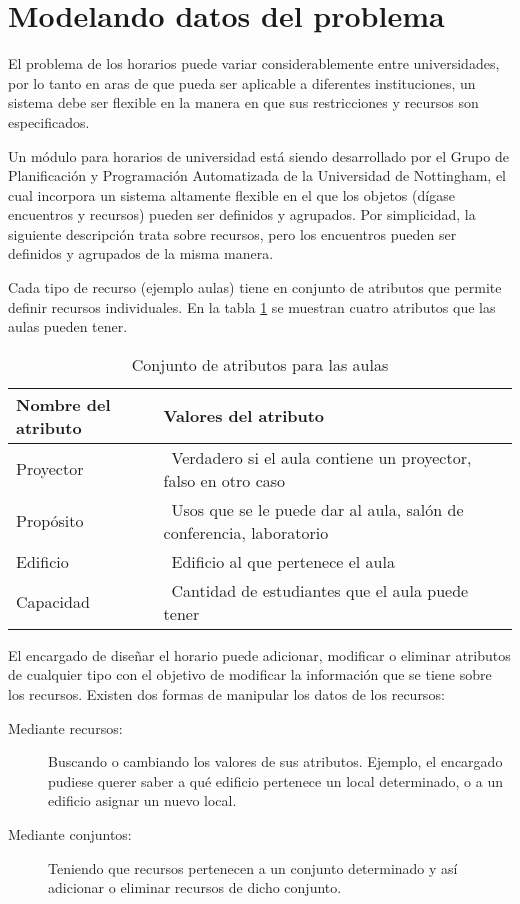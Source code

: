 \section{Modelando datos del problema}

El problema de los horarios puede variar considerablemente entre universidades, por lo tanto en aras de que pueda ser aplicable a diferentes instituciones, un sistema debe ser flexible en la manera en que sus restricciones y recursos son especificados.

Un módulo para horarios de universidad está siendo desarrollado por el Grupo de Planificación y Programación Automatizada de la Universidad de Nottingham, el cual incorpora un sistema altamente flexible en el que los objetos (dígase encuentros y recursos) pueden ser definidos y agrupados. Por simplicidad, la siguiente descripción trata sobre recursos, pero los encuentros pueden ser definidos y agrupados de la misma manera.

Cada tipo de recurso (ejemplo aulas) tiene en conjunto de atributos que permite definir recursos individuales. En la tabla \ref{table:atributes} se muestran cuatro atributos que las aulas pueden tener.

\begin{table}
	\caption{Conjunto de atributos para las aulas}
	\begin{center}
		\label{table:atributes}
		\begin{tabular}{lp{7.5cm}r}
			Nombre del atributo & Valores del atributo \\ \hline
			Proyector &\ Verdadero si el aula contiene un proyector, falso en otro caso \\
			Propósito &\ Usos que se le puede dar al aula, salón de conferencia, laboratorio \\
			Edificio &\ Edificio al que pertenece el aula \\
			Capacidad &\ Cantidad de estudiantes que el aula puede tener
		\end{tabular}
	\end{center}
\end{table}

El encargado de diseñar el horario puede adicionar, modificar o eliminar atributos de cualquier tipo con el objetivo de modificar la información que se tiene sobre los recursos. Existen dos formas de manipular los datos de los recursos:

\begin{description}
	\item[Mediante recursos:] Buscando o cambiando los valores de sus atributos. Ejemplo, el encargado pudiese querer saber a qu\'e edificio pertenece un local determinado, o a un edificio asignar un nuevo local.
	\item[Mediante conjuntos:] Teniendo que recursos pertenecen a un conjunto determinado y as\'i adicionar o eliminar recursos de dicho conjunto.
\end{description}

